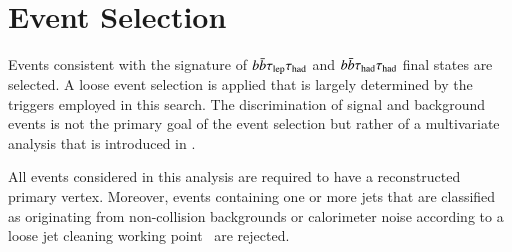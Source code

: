 \section{Event Selection}%
\label{sec:event_selection}

Events consistent with the signature of $b\bar{b}\tau_{\text{lep}}\tau_{\text{had}}$ and $b\bar{b}\tau_{\text{had}}\tau_{\text{had}}$
final states are selected. A loose event selection is applied that is largely
determined by the triggers employed in this search. The discrimination of signal
and background events is not the primary goal of the event selection but rather
of a multivariate analysis that is introduced in
.

All events considered in this analysis are required to have a reconstructed
primary vertex. Moreover, events containing one or more jets that are classified
as originating from non-collision backgrounds or calorimeter noise according to
a loose jet cleaning working point~\cite{ATLAS-CONF-2015-029} are rejected.





